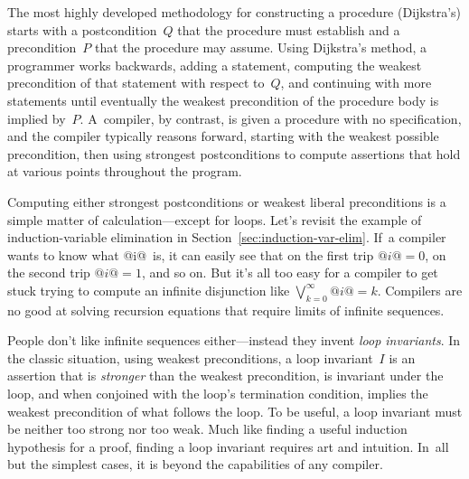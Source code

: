 \documentclass[blockstyle,preprint,nocopyrightspace]{sigplanconf}
\newcommand\secref[1]{Section~\ref{sec:#1}}
\begin{document}
The most highly developed
methodology for constructing a procedure (Dijkstra's) starts with a
postcondition~$Q$ that the procedure must establish and a
precondition~$P$ that the procedure may assume.
Using Dijkstra's method, a programmer 
works backwards, adding a statement, computing the weakest
precondition of that statement with respect to~$Q$,
and continuing with more statements until
eventually the weakest precondition of the procedure body is implied by~$P$.
A~compiler, by contrast, is given a procedure with no specification,
and the compiler typically reasons forward,  starting with the
weakest possible precondition, then using strongest postconditions to
compute assertions that hold at various points throughout the program.


Computing either strongest postconditions or weakest liberal
preconditions is a simple matter of calculation---except for loops.
Let's revisit the example of induction-variable elimination in
\secref{induction-var-elim}. 
If~a compiler wants to know what @i@~is, it can easily see that on the
first trip $@i@=0$, on the second trip $@i@=1$, and so on.
But it's all too easy for a compiler to get stuck trying to compute an
infinite disjunction like $\bigvee_{k=0}^{\infty} @i@=k$.
Compilers are no good at solving recursion
equations that require limits of infinite sequences.

People don't like infinite sequences either---instead they invent
\emph{loop invariants}. 
In the classic situation, using weakest preconditions, a loop
invariant~$I$ is an assertion that is \emph{stronger} than the weakest
precondition, is invariant under the loop, and when conjoined with
the loop's termination condition, implies the weakest precondition of
what follows the loop.
To be useful, a loop invariant must be neither too strong nor too
weak.
Much like finding a useful induction hypothesis for a proof, 
finding a loop invariant requires art and intuition.
In~all but the simplest cases, it is beyond the capabilities of any
compiler.
\end{document}

